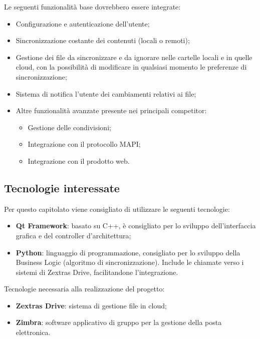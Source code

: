 \documentclass[../studio_di_fattibilita.tex]{subfiles}
\begin{document}
Le seguenti funzionalità base dovrebbero essere integrate:
\begin{itemize}
	\item Configurazione e autenticazione dell’utente;
	\item Sincronizzazione costante dei contenuti (locali o remoti);
	\item Gestione dei file da sincronizzare e da ignorare nelle cartelle locali e in quelle cloud, con la possibilità di modificare in qualsiasi momento le preferenze di sincronizzazione;
	\item Sistema di notifica l’utente dei cambiamenti relativi ai file;
	\item Altre funzionalità avanzate presente nei principali competitor:
	      \begin{itemize}
		      \item Gestione delle condivisioni;
		      \item Integrazione con il protocollo MAPI;
		      \item Integrazione con il prodotto web.
	      \end{itemize}
\end{itemize}

\subsection{Tecnologie interessate}%
\label{sub:c7_tecnologie_interessate}
Per questo capitolato viene consigliato di utilizzare le seguenti tecnologie:
\begin{itemize}
	\item \textbf{Qt Framework}: basato su C++, è consigliato per lo sviluppo dell’interfaccia grafica e del controller d’architettura;
	\item \textbf{Python}: linguaggio di programmazione, consigliato per lo sviluppo della Business Logic (algoritmo di sincronizzazione). Include le chiamate  verso i sistemi di Zextras Drive, facilitandone l’integrazione.
\end{itemize}

Tecnologie necessaria alla realizzazione del progetto:
\begin{itemize}
	\item \textbf{Zextras Drive}: sistema di gestione file in cloud;
	\item \textbf{Zimbra}: software applicativo di gruppo per la gestione della posta elettronica.
\end{itemize}
\end{document}
